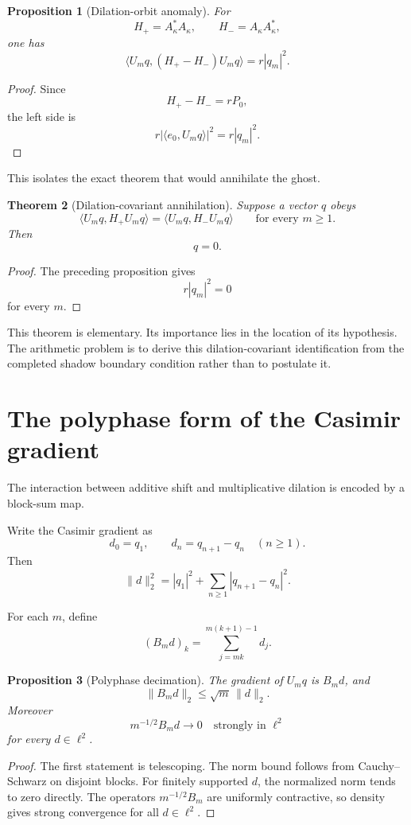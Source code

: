 \documentclass[11pt]{article}
\newtheorem{theorem}{Theorem}[section]
\newtheorem{proposition}[theorem]{Proposition}
\theoremstyle{definition}
\theoremstyle{remark}
\begin{document}
\begin{proposition}[Dilation-orbit anomaly]
For
\[
H_+=A_\kappa^*A_\kappa,
\qquad
H_-=A_\kappa A_\kappa^*,
\]
one has
\[
\boxed{
\langle U_mq,(H_+-H_-)U_mq\rangle
=
r|q_m|^2.
}
\]
\end{proposition}

\begin{proof}
Since
\[
H_+-H_-=rP_0,
\]
the left side is
\[
r|\langle e_0,U_mq\rangle|^2=r|q_m|^2.
\]
\end{proof}

This isolates the exact theorem that would annihilate the ghost.

\begin{theorem}[Dilation-covariant annihilation]
Suppose a vector \(q\) obeys
\[
\langle U_mq,H_+U_mq\rangle
=
\langle U_mq,H_-U_mq\rangle
\qquad\text{for every }m\ge1.
\]
Then
\[
q=0.
\]
\end{theorem}

\begin{proof}
The preceding proposition gives
\[
r|q_m|^2=0
\]
for every \(m\).
\end{proof}

This theorem is elementary.  Its importance lies in the location of its hypothesis.  The arithmetic problem is to derive this dilation-covariant identification from the completed shadow boundary condition rather than to postulate it.

\section{The polyphase form of the Casimir gradient}

The interaction between additive shift and multiplicative dilation is encoded by a block-sum map.

Write the Casimir gradient as
\[
d_0=q_1,\qquad
d_n=q_{n+1}-q_n\quad(n\ge1).
\]
Then
\[
\|d\|_2^2
=
|q_1|^2+\sum_{n\ge1}|q_{n+1}-q_n|^2.
\]

For each \(m\), define
\[
(B_md)_k
=
\sum_{j=mk}^{m(k+1)-1}d_j.
\]

\begin{proposition}[Polyphase decimation]
The gradient of \(U_mq\) is \(B_md\), and
\[
\|B_md\|_2\le\sqrt m\,\|d\|_2.
\]
Moreover
\[
\boxed{
m^{-1/2}B_md\longrightarrow0
\quad\text{strongly in }\ell^2
}
\]
for every \(d\in\ell^2\).
\end{proposition}

\begin{proof}
The first statement is telescoping.  The norm bound follows from Cauchy--Schwarz on disjoint blocks.  For finitely supported \(d\), the normalized norm tends to zero directly.  The operators \(m^{-1/2}B_m\) are uniformly contractive, so density gives strong convergence for all \(d\in\ell^2\).
\end{proof}
\end{document}
